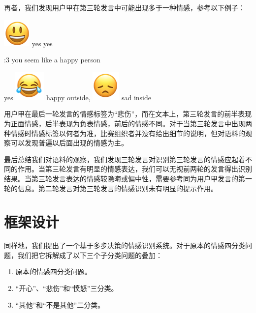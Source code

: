 再者，我们发现用户甲在第三轮发言中可能出现多于一种情感，参考以下例子：

 \includegraphics[height=1.5\fontcharht\font`\B]{img/emoji/laugh.png} yes yes \par
{} :3 you seem like a happy person \par
{} yes \includegraphics[height=1.5\fontcharht\font`\B]{img/emoji/lol.png} happy outside, \includegraphics[height=1.5\fontcharht\font`\B]{img/emoji/frown.png} sad inside \par

用户甲在最后一轮发言的情感标签为“悲伤”，而在文本上，第三轮发言的前半表现为正面情感，后半表现为负表情感，前后的情感不同。对于当第三轮发言中出现两种情感时情感标签以何者为准，比赛组织者并没有给出细节的说明，但对语料的观察可以发现普遍以后面出现的情感为主。

最后总结我们对语料的观察，我们发现三轮发言对识别第三轮发言的情感应起着不同的作用。当第三轮发言有明显的情感表达，我们可以无视前两轮的发言得出识别结果。当第三轮发言表达的情感较隐晦或偏中性，需要参考同为用户甲发言的第一轮的信息。第二轮发言对第三轮发言的情感识别未有明显的提示作用。

\section{框架设计}
\label{sec:exp_context_emo_framework}

同样地，我们提出了一个基于多步决策的情感识别系统。对于原本的情感四分类问题，我们把它拆解成了以下三个子分类问题的叠加：

\begin{enumerate}

\item 原本的情感四分类问题。
\item “开心”、“悲伤”和“愤怒”三分类。
\item “其他”和“不是其他”二分类。

\end{enumerate}

